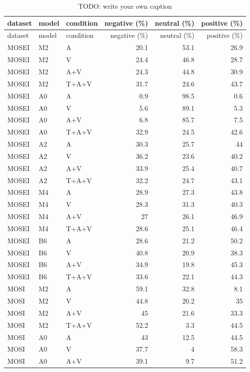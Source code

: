 {\scriptsize
\begin{longtable}{lllrrr}
\caption{TODO: write your own caption}\label{tab:T13-predicted-class-shares} \\
\toprule
dataset & model & condition & negative (\%) & neutral (\%) & positive (\%) \\
\midrule
\endfirsthead
\toprule
dataset & model & condition & negative (\%) & neutral (\%) & positive (\%) \\
\midrule
\endhead
\bottomrule
\endfoot
MOSEI & M2 & A & 20.1 & 53.1 & 26.9 \\
MOSEI & M2 & V & 24.4 & 46.8 & 28.7 \\
MOSEI & M2 & A+V & 24.3 & 44.8 & 30.9 \\
MOSEI & M2 & T+A+V & 31.7 & 24.6 & 43.7 \\
MOSEI & A0 & A & 0.9 & 98.5 & 0.6 \\
MOSEI & A0 & V & 5.6 & 89.1 & 5.3 \\
MOSEI & A0 & A+V & 6.8 & 85.7 & 7.5 \\
MOSEI & A0 & T+A+V & 32.9 & 24.5 & 42.6 \\
MOSEI & A2 & A & 30.3 & 25.7 & 44 \\
MOSEI & A2 & V & 36.2 & 23.6 & 40.2 \\
MOSEI & A2 & A+V & 33.9 & 25.4 & 40.7 \\
MOSEI & A2 & T+A+V & 32.2 & 24.7 & 43.1 \\
MOSEI & M4 & A & 28.9 & 27.3 & 43.8 \\
MOSEI & M4 & V & 28.3 & 31.3 & 40.3 \\
MOSEI & M4 & A+V & 27 & 26.1 & 46.9 \\
MOSEI & M4 & T+A+V & 28.6 & 25.1 & 46.4 \\
MOSEI & B6 & A & 28.6 & 21.2 & 50.2 \\
MOSEI & B6 & V & 40.8 & 20.9 & 38.3 \\
MOSEI & B6 & A+V & 34.9 & 19.8 & 45.3 \\
MOSEI & B6 & T+A+V & 33.6 & 22.1 & 44.3 \\
MOSI & M2 & A & 59.1 & 32.8 & 8.1 \\
MOSI & M2 & V & 44.8 & 20.2 & 35 \\
MOSI & M2 & A+V & 45 & 21.6 & 33.3 \\
MOSI & M2 & T+A+V & 52.2 & 3.3 & 44.5 \\
MOSI & A0 & A & 43 & 12.5 & 44.5 \\
MOSI & A0 & V & 37.7 & 4 & 58.3 \\
MOSI & A0 & A+V & 39.1 & 9.7 & 51.2 \\

\end{longtable}}
